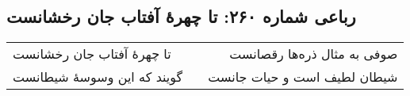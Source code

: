 \begin{center}
\section*{رباعی شماره ۲۶۰: تا چهرهٔ آفتاب جان رخشانست}
\label{sec:0260}
\begin{longtable}{l p{0.5cm} r}
تا چهرهٔ آفتاب جان رخشانست
&&
صوفی به مثال ذره‌ها رقصانست
\\
گویند که این وسوسهٔ شیطانست
&&
شیطان لطیف است و حیات جانست
\\
\end{longtable}
\end{center}
